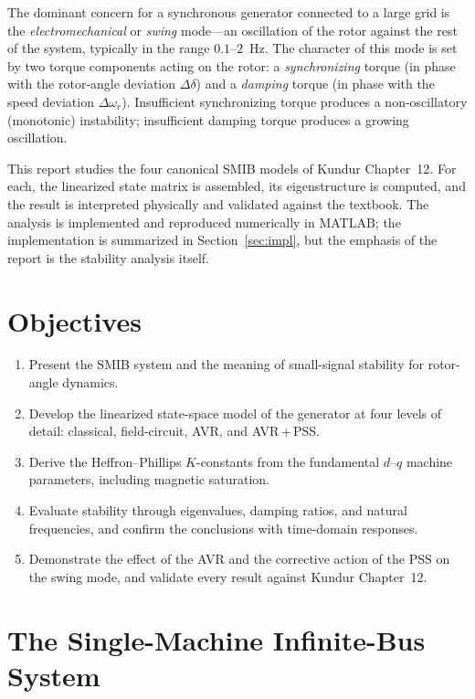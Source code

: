 \documentclass[12pt,a4paper]{article}
\newcommand{\dwr}{\Delta\omega_r}
\newcommand{\ddel}{\Delta\delta}
\begin{document}
The dominant concern for a synchronous generator connected to a large grid is
the \textit{electromechanical} or \textit{swing} mode---an oscillation of the
rotor against the rest of the system, typically in the range $0.1$--$2$~Hz. The
character of this mode is set by two torque components acting on the rotor: a
\textit{synchronizing} torque (in phase with the rotor-angle deviation $\ddel$)
and a \textit{damping} torque (in phase with the speed deviation $\dwr$).
Insufficient synchronizing torque produces a non-oscillatory (monotonic)
instability; insufficient damping torque produces a growing oscillation.

This report studies the four canonical SMIB models of Kundur Chapter~12. For
each, the linearized state matrix is assembled, its eigenstructure is computed,
and the result is interpreted physically and validated against the textbook.
The analysis is implemented and reproduced numerically in MATLAB; the
implementation is summarized in Section~\ref{sec:impl}, but the emphasis of the
report is the stability analysis itself.

\section{Objectives}

\begin{enumerate}
    \item Present the SMIB system and the meaning of small-signal stability for
          rotor-angle dynamics.
    \item Develop the linearized state-space model of the generator at four
          levels of detail: classical, field-circuit, AVR, and AVR\,+\,PSS.
    \item Derive the Heffron--Phillips $K$-constants from the fundamental
          $d$--$q$ machine parameters, including magnetic saturation.
    \item Evaluate stability through eigenvalues, damping ratios, and natural
          frequencies, and confirm the conclusions with time-domain responses.
    \item Demonstrate the effect of the AVR and the corrective action of the PSS
          on the swing mode, and validate every result against Kundur
          Chapter~12.
\end{enumerate}

\section{The Single-Machine Infinite-Bus System}
\label{sec:smib}
\end{document}
